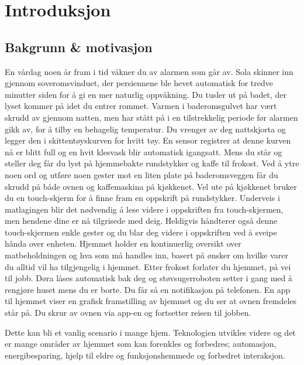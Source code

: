\section[Introduksjon]{Introduksjon}
\subsection*{Bakgrunn \& motivasjon}
En vårdag noen år fram i tid våkner du av alarmen som går av. Sola skinner inn gjennom soveromsvinduet, der persiennene ble hevet automatisk for tredve minutter siden for å gi en mer naturlig oppvåkning. Du tusler ut på badet, der lyset kommer på idet du entrer rommet. Varmen i baderomsgulvet har vært skrudd av gjennom natten, men har stått på i en tilstrekkelig periode før alarmen gikk av, for å tilby en behagelig temperatur. Du vrenger av deg nattskjorta og legger den i skittentøyskurven for hvitt tøy. En sensor registrer at denne kurven nå er blitt full og en hvit klesvask blir automatisk igangsatt. Mens du står og steller deg får du lyst på hjemmebakte rundstykker og kaffe til frokost. Ved å ytre noen ord og utføre noen gester mot en liten plate på baderomsveggen får du skrudd på både ovnen og kaffemaskina på kjøkkenet. Vel ute på kjøkkenet bruker du en touch-skjerm for å finne fram en oppskrift på rundstykker. Underveis i matlagingen blir det nødvendig å lese videre i oppskriften fra touch-skjermen, men hendene dine er nå tilgrisede med deig. Heldigvis håndterer også denne touch-skjermen enkle gester og du blar deg videre i oppskriften ved å sveipe hånda over enheten. Hjemmet holder en kontinuerlig oversikt over matbeholdningen og hva som må handles inn, basert på ønsker om hvilke varer du alltid vil ha tilgjengelig i hjemmet. Etter frokost forlater du hjemmet, på vei til jobb. Døra låses automatisk bak deg og støvsugerroboten setter i gang med å rengjøre huset mens du er borte. Du får så en notifikasjon på telefonen. En app til hjemmet viser en grafisk framstilling av hjemmet og du ser at ovnen fremdeles står på. Du skrur av ovnen via app-en og fortsetter reisen til jobben.

Dette kan bli et vanlig scenario i mange hjem. Teknologien utvikles videre og det er mange områder av hjemmet som kan forenkles og forbedres; automasjon, energibesparing, hjelp til eldre og funksjonshemmede og forbedret interaksjon.

